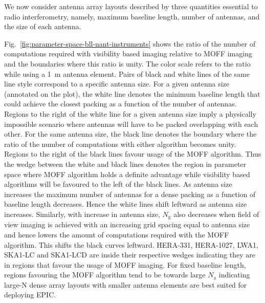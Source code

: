 \documentclass[a4paper,fleqn,usenatbib]{../mnras}
\begin{document}
We now consider antenna array layouts described by three quantities essential
to radio interferometry, namely, maximum baseline length, number of antennas,
and the size of each antenna. 

Fig.~\ref{fig:parameter-space-bll-nant-instruments} shows the ratio of the
number of computations required with visibility based imaging relative to 
MOFF imaging and the boundaries where this ratio is unity. The color scale 
refers to the ratio while using a 1~m antenna element. Pairs of black and
white lines of the same line style correspond to a specific antenna size. For 
a given antenna size (annotated on the plot), the white line denotes the 
minimum baseline length that could achieve the closest packing as a function 
of the number of antennas. Regions to the right of the white line for a 
given antenna size imply a physically impossible scenario where antennas will 
have to be packed overlapping with each other. For the same antenna size, the 
black line denotes the boundary where the ratio of the number of computations 
with either algorithm becomes unity. Regions to the right of the black lines 
favour usage of the MOFF algorithm. Thus the wedge between the white and black 
lines denotes the region in parameter space where MOFF algorithm holds a 
definite advantage while visibility based algorithms will be favoured to the 
left of the black lines. As antenna size increases the maximum number of 
antennas for a dense packing as a function of baseline length decreases. Hence 
the white lines shift leftward as antenna size increases. Similarly, with 
increase in antenna size, $N_\textrm{g}$ also decreases when field of view 
imaging is achieved with an increasing grid spacing equal to antenna size and
hence lowers the amount of computations required with the MOFF algorithm. This
shifts the black curves leftward. HERA-331, HERA-1027, LWA1, SKA1-LC and 
SKA1-LCD are inside their respective wedges indicating they are in regions that
favour the usage of MOFF imaging. For fixed baseline length, regions favouring
the MOFF algorithm tend to be towards large $N_\textrm{a}$ indicating large-N
dense array layouts with smaller antenna elements are best suited for deploying 
EPIC.
\end{document}
